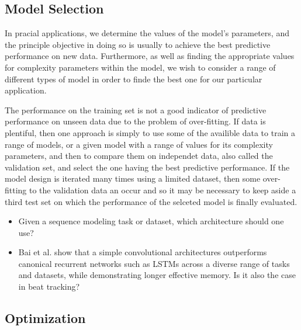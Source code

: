 \documentclass{scrartcl}
\begin{document}
\subsection{Model Selection}

In pracial applications, we determine the values of the model's parameters, and the principle objective in doing so is usually to achieve the best predictive performance on new data. Furthermore, as well as finding the appropriate values for complexity parameters within the model, we wish to consider a range of different types of model in order to finde the best one for our particular application. 

The performance on the training set is not a good indicator of predictive performance on unseen data due to the problem of over-fitting. If data is plentiful, then one approach is simply to use some of the availible data to train a range of models, or a given model with a range of values for its complexity parameters, and then to compare them on independet data, also called the validation set, and select the one having the best predictive performance. If the model design is iterated many times using a limited dataset, then some over-fitting to the validation data an occur and so it may be necessary to keep aside a third test set on which the performance of the selceted model is finally evaluated. 


\begin{itemize}
\item Given a sequence modeling task or dataset, which architecture should one use?
\item Bai et al. \cite{Bai2018} show that a simple convolutional architectures outperforms canonical recurrent networks such as LSTMs across a diverse range of tasks and datasets, while demonstrating longer effective memory. Is it also the case in beat tracking?
\end{itemize}


\subsection{Optimization}
\end{document}
